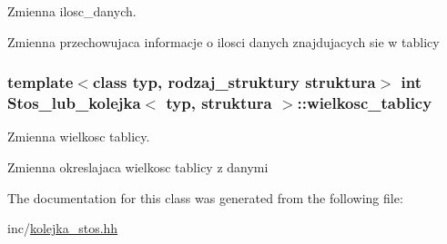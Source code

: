 Zmienna ilosc\+\_\+danych. 

Zmienna przechowujaca informacje o ilosci danych znajdujacych sie w tablicy \hypertarget{class_stos__lub__kolejka_a73d579d36148bb5047d5d6693aa69b57}{
\subsubsection[{wielkosc\+\_\+tablicy}]{\setlength{\rightskip}{0pt plus 5cm}template$<$class typ, rodzaj\+\_\+struktury struktura$>$ int {\bf Stos\+\_\+lub\+\_\+kolejka}$<$ typ, struktura $>$\+::wielkosc\+\_\+tablicy}}\label{class_stos__lub__kolejka_a73d579d36148bb5047d5d6693aa69b57}


Zmienna wielkosc tablicy. 

Zmienna okreslajaca wielkosc tablicy z danymi 

The documentation for this class was generated from the following file\+:\begin{DoxyCompactItemize}
\item 
inc/\hyperlink{kolejka__stos_8hh}{kolejka\+\_\+stos.\+hh}\end{DoxyCompactItemize}
